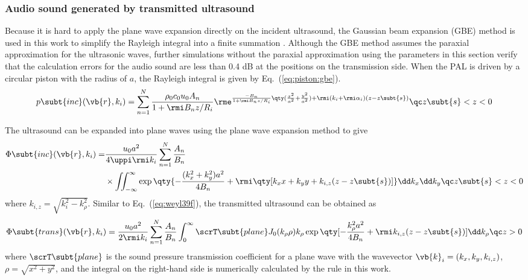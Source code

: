 \subsubsection{Audio sound generated by transmitted
ultrasound}
Because it is hard to apply the plane wave expansion
directly on the incident ultrasound, the Gaussian beam
expansion (GBE) method is used in this work to simplify the
Rayleigh integral into a finite summation \cite{Wen1988DiffractionBeamField}. 
Although
the GBE method assumes the paraxial approximation for the
ultrasonic waves, further simulations  without the paraxial approximation using the
parameters in this section verify that the calculation errors for
the audio sound are less than 0.4 dB at the positions on the
transmission side. When the PAL is driven by a circular piston
with the radius of $a$, the Rayleigh integral is given by Eq.~(\ref{eq:piston:gbe}).
\begin{equation}
    p\subt{inc}(\vb{r},k_i) = 
    \sum_{n=1}^N \frac{\rho_0c_0u_0 A_n}{1+\rmi B_nz/R_i}
    \rme^{\frac{-B_n}{1+\rmi B_n z/R_i} \qty(\frac{x^2}{a^2}+\frac{y^2}{a^2}) + \rmi (k_i+\rmi \alpha_i)(z-z\subt{s})}
    \qc
    z\subt{s} < z < 0
\end{equation}

The ultrasound can be expanded into plane waves using
the plane wave expansion method to give
\begin{equation}
    \begin{split}
    \Phi\subt{inc}(\vb{r},k_i)
    = &\frac{u_0a^2}{4\uppi \rmi k_i}
    \sum_{n=1}^N \frac{A_n}{B_n}\\
      &\times\iint_{-\infty}^\infty 
    \exp\qty{- \frac{(k_x^2+k_y^2)a^2}{4B_n} + \rmi \qty[k_x x+k_y y + k_{i,z}(z-z\subt{s})]}
    \dd k_x \dd k_y
    \qc
    z\subt{s}<z<0
    \end{split}
\end{equation}
where $k_{i,z} = \sqrt{k_i^2-k_\rho^2}$. 
Similar to Eq.~(\ref{eq:weyl39f}), the transmitted ultrasound can be obtained as
\begin{equation}
    \Phi\subt{trans}(\vb{r},k_i) = 
    \frac{u_0a^2}{2\rmi k_i}
    \sum_{n=1}^N \frac{A_n}{B_n}
    \int_0^\infty \scrT\subt{plane}J_0(k_\rho\rho)k_\rho
    \exp\qty[-\frac{k_\rho^2 a^2}{4B_n} + \rmi k_{i,z}(z-z\subt{s})]\dd k_\rho
    \qc
    z>0
\end{equation}
where $\scrT\subt{plane}$ is the sound pressure transmission coefficient for a
plane wave with the wavevector $\vb{k}_i = (k_x,k_y,k_{i,z})$,
$\rho=\sqrt{x^2+y^2}$, 
and the integral on the right-hand side is
numerically calculated by the  rule in this
work.

